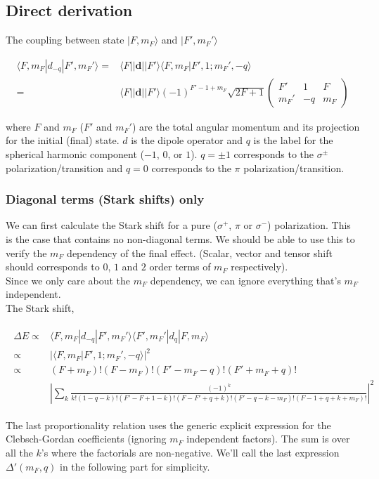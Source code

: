 \documentclass[10pt,fleqn]{article}
\newcommand{\eqar}[1]
{
  \begin{align}
    #1
  \end{align}
}
\newcommand{\abs}[1]{{\left|{#1}\right|}}
\begin{document}

\subsection{Direct derivation}
The coupling between state $|F,m_F\rangle$ and $|F',m_F'\rangle$
\eqar{
  \langle F,m_F|d_{-q}|F',m_F'\rangle=&\langle F||\mathbf{d}||F'\rangle\langle F,m_F|F',1;m_F',-q\rangle\\
  =&\langle F||\mathbf{d}||F'\rangle (-1)^{F'-1+m_F}\sqrt{2F+1}
  \begin{pmatrix}
    F'&1&F\\
    m_F'&-q&m_F
  \end{pmatrix}
}
where $F$ and $m_F$ ($F'$ and $m_F'$) are the total angular momentum and its projection
for the initial (final) state. $d$ is the dipole operator and $q$ is the label
for the spherical harmonic component ($-1$, $0$, or $1$).
$q=\pm1$ corresponds to the $\sigma^\pm$ polarization/transition
and $q=0$ corresponds to the $\pi$ polarization/transition.\\

\subsubsection{Diagonal terms (Stark shifts) only}\label{stark-shift-explicit}
We can first calculate the Stark shift for a pure
($\sigma^+$, $\pi$ or $\sigma^-$) polarization.
This is the case that contains no non-diagonal terms.
We should be able to use this to verify the $m_F$ dependency of the final effect.
(Scalar, vector and tensor shift should corresponds to $0$, $1$ and $2$ order terms
of $m_F$ respectively).\\

Since we only care about the $m_F$ dependency, we can ignore everything that's
$m_F$ independent.\\

The Stark shift,
\eqar{
  \begin{split}
    \Delta E\propto&\langle F,m_F|d_{-q}|F',m_F'\rangle
                     \langle F',m_F'|d_q|F,m_F\rangle\\
    \propto&\abs{\langle F,m_F|F',1;m_F',-q\rangle}^2\\
    \propto&(F+m_F)!(F-m_F)!(F'-m_F-q)!(F'+m_F+q)!\\
                   &\abs{\sum_{k}\frac{(-1)^k}{k!(1\!-\!q\!-\!k)!(F'\!-\!F\!+\!1\!-\!k)!(F\!-\!F'\!+\!q\!+\!k)!(F'\!-\!q\!-\!k\!-\!m_F)!(F\!-\!1\!+\!q\!+\!k\!+\!m_F)!}}^2
  \end{split}
}
The last proportionality relation uses the generic explicit expression for the
Clebsch-Gordan coefficients (ignoring $m_F$ independent factors).
The sum is over all the $k$'s where the factorials are non-negative.
We'll call the last expression $\Delta'(m_F,q)$ in the following part for simplicity.
\end{document}
